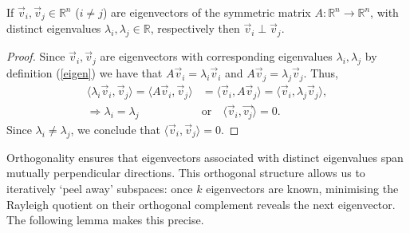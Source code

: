 \begin{lemma} \label{eigenvec_perp}
If $\vec{v}_i, \vec{v}_j \in \mathbb{R}^n$ ($i\neq j$) are eigenvectors of the symmetric matrix $A:\mathbb{R}^n\rightarrow\mathbb{R}^n$, with distinct eigenvalues $\lambda_i, \lambda_j \in \mathbb{R}$, respectively then $\vec{v}_i \perp \vec{v}_j$.
\end{lemma}
\begin{proof}
Since $\vec{v}_i, \vec{v}_j$ are eigenvectors with corresponding eigenvalues $\lambda_i, \lambda_j$ by definition (\ref{eigen}) we have that $A\vec{v}_i = \lambda_i \vec{v}_i$ and $A\vec{v}_j = \lambda_j \vec{v}_j$. Thus, 
\begin{align*}
\langle \lambda_i\vec{v}_i, \vec{v}_j \rangle = \langle A\vec{v}_i, \vec{v}_j \rangle &= \langle \vec{v}_i, A\vec{v}_j \rangle = \langle \vec{v}_i, \lambda_j\vec{v}_j \rangle, \\
\Rightarrow \lambda_i = \lambda_j \quad &\text{or} \quad \langle\vec{v}_i,\vec{v_j}\rangle = 0.
\end{align*}
Since $\lambda_i\neq \lambda_j$, we conclude that $\langle \vec{v}_i, \vec{v}_j \rangle = 0$.
\end{proof}

\noindent Orthogonality ensures that eigenvectors associated with distinct eigenvalues span mutually perpendicular directions. This orthogonal structure allows us to iteratively ‘peel away’ subspaces: once $k$ eigenvectors are known, minimising the Rayleigh quotient on their orthogonal complement reveals the next eigenvector. The following lemma makes this precise.

